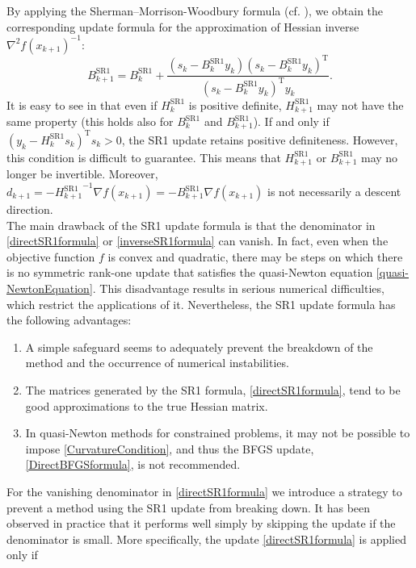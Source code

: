 By applying the Sherman–Morrison-Woodbury formula (cf. \cite[Theorem~1.2.16]{SunYuan:2006}), we obtain the corresponding update formula for the approximation of Hessian inverse ${\nabla^{2} f(x_{k+1})}^{-1}$:
\begin{equation}\label{inverseSR1formula}
    B^\mathrm{SR1}_{k+1} = B^\mathrm{SR1}_k + \frac{(s_k - B^\mathrm{SR1}_k y_k) (s_k - B^\mathrm{SR1}_k y_k)^{\mathrm{T}}}{(s_k - B^\mathrm{SR1}_k y_k)^{\mathrm{T}} y_k}.
\end{equation}
It is easy to see in that even if $H^\mathrm{SR1}_k$ is positive definite, $H^\mathrm{SR1}_{k+1}$ may not have the same property (this holds also for $B^\mathrm{SR1}_k$ and $B^\mathrm{SR1}_{k+1}$). If and only if $(y_k - H^\mathrm{SR1}_k s_k)^{\mathrm{T}} s_k > 0$, the SR1 update retains positive definiteness. However, this condition is difficult to guarantee. This means that $H^\mathrm{SR1}_{k+1}$ or $B^\mathrm{SR1}_{k+1}$ may no longer be invertible. Moreover, $d_{k+1} = -{H^\mathrm{SR1}_{k+1}}^{-1} \nabla f(x_{k+1}) = -B^\mathrm{SR1}_{k+1} \nabla f(x_{k+1})$ is not necessarily a descent direction. \\
The main drawback of the SR1 update formula is that the denominator in \cref{directSR1formula} or \cref{inverseSR1formula} can vanish. In fact, even when the objective function $f$ is convex and quadratic, there may be steps on which there is no symmetric rank-one update that satisfies the quasi-Newton equation \cref{quasi-NewtonEquation}. This disadvantage results in serious numerical difficulties, which restrict the applications of it. Nevertheless, the SR1 update formula has the following advantages:
\begin{enumerate}
    \item A simple safeguard seems to adequately prevent the breakdown of the method and the occurrence of numerical instabilities.
    \item The matrices generated by the SR1 formula, \cref{directSR1formula}, tend to be good approximations to the true Hessian matrix.
    \item In quasi-Newton methods for constrained problems, it may not be possible to impose \cref{CurvatureCondition}, and thus the BFGS update, \cref{DirectBFGSformula}, is not recommended. 
\end{enumerate}
For the vanishing denominator in \cref{directSR1formula} we introduce a strategy to prevent a method using the SR1 update from breaking down. It has been observed in practice that it performs well simply by skipping the update if the denominator is small. More specifically, the update \cref{directSR1formula} is applied only if 
